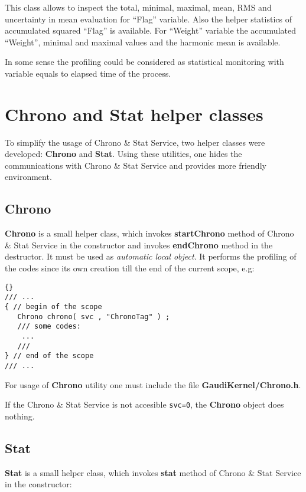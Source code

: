 \documentclass{lhcbnote}
\newcommand{\bftt}         {\ttfamily\bfseries}
\renewcommand{\it}         {\itshape}
\renewcommand{\tt}         {\ttfamily}
\begin{document}
This class allows to inspect the total, minimal, maximal, 
mean, RMS and uncertainty in mean evaluation 
for ``Flag'' variable. Also the helper statistics of 
accumulated squared ``Flag'' is available.
For ``Weight'' variable the accumulated ``Weight'', 
minimal and maximal values and the harmonic mean is available. 


In some sense the profiling could be considered as 
statistical monitoring with variable {\tt{Flag}} equals 
to elapsed time of the process.   
 
\chapter{{\bftt{Chrono}} and {\bftt{Stat}} helper classes}

 To simplify the usage  of Chrono \& Stat Service, 
two helper classes were developed: {\bftt{Chrono}} 
and {\bftt{Stat}}. 
Using these utilities, one hides the communications with 
Chrono \& Stat Service and provides more friendly environment. 

\section{\bftt{Chrono}} 
{\bftt{Chrono}} is a small helper class, which 
invokes {\bftt{startChrono}} method of Chrono \& Stat Service 
in the  constructor  and invokes {\bftt{endChrono}} 
method in the  destructor. It must be used as 
{\it automatic local object}.  It performs the profiling of the 
codes since its own creation till the end of the current scope, e.g: 

\begin{lstlisting}{}
/// ... 
{ // begin of the scope 
   Chrono chrono( svc , "ChronoTag" ) ;
   /// some codes:
    ...
   ///
} // end of the scope
/// ...  
\end{lstlisting}   

For usage of {\bftt{Chrono}} utility one must include the file 
{\bftt{GaudiKernel/Chrono.h}}.

If the Chrono \& Stat Service  is not accesible \verb+svc=0+,
the {\bftt{Chrono}} object does nothing.
 
\section{{\bftt{Stat}}}

{\bftt{Stat}} is a small helper class, which 
invokes {\bftt{stat}} method of Chrono \& Stat Service 
in the  constructor:
\end{document}
